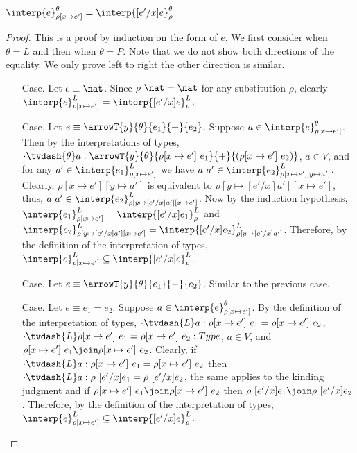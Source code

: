 \begin{lemma}
  \label{lemma:movable_subs}
  $\interp{e}^\theta_{\rho[x \mapsto e']} = \interp{[e'/x]e}^\theta_\rho$
\end{lemma}
\begin{proof}
  This is a proof by induction on the form of $e$.  We first consider when $\theta = L$ and
  then when $\theta = P$.  Note that we do not show both directions of the equality.  We only
  prove left to right the other direction is similar.
  
  \begin{itemize}
  \item[Case.] Let $e \equiv \nat$.  
    Since $\rho\ \nat = \nat$ for any substitution $\rho$, clearly
    $\interp{e}^L_{\rho[x \mapsto e']} = \interp{[e'/x]e}^L_\rho$.

  \item[Case.] Let $e \equiv \arrowT{y}{\theta}{e_1}{+}{e_2}$.  Suppose 
    $a \in \interp{e}^\theta_{\rho[x \mapsto e']}$.  Then by the interpretations of types,
    $\cdot \tvdash{\theta} a:
    \arrowT{y}{\theta}{\rho[x \mapsto e']\ e_1}{+}{(\rho[x \mapsto e']\ e_2)}$, 
    $a \in V$,
    and for any $a' \in \interp{e_1}^L_{\rho[x \mapsto e']}$ we have 
    $a\ a' \in \interp{e_2}^L_{\rho[x \mapsto e'][y \mapsto a']}$.  Clearly, 
    $\rho[x \mapsto e'][y \mapsto a']$ is equivalent to
    $\rho[y \mapsto [e'/x]a'][x \mapsto e']$, thus, 
    $a\ a' \in \interp{e_2}^L_{\rho[y \mapsto [e'/x]a'][x \mapsto e']}$.  Now by the induction
    hypothesis, $\interp{e_1}^L_{\rho[x \mapsto e']} = \interp{[e'/x]e_1}^L_{\rho}$ and
    $\interp{e_2}^L_{\rho[y \mapsto [e'/x]a'][x \mapsto e']} = 
    \interp{[e'/x]e_2}^L_{\rho[y \mapsto [e'/x]a']}$.  Therefore, by the definition of the 
    interpretation of types, $\interp{e}^L_{\rho[x \mapsto e']} \subseteq \interp{[e'/x]e}^L_\rho$.

  \item[Case.]  Let $e \equiv \arrowT{y}{\theta}{e_1}{-}{e_2}$.  Similar to the previous case.

  \item[Case.] Let $e \equiv e_1 = e_2$.  Suppose $a \in \interp{e}^\theta_{\rho[x \mapsto e']}$.
    By the definition of the interpretation of types, 
    $\cdot \tvdash{L} a:\rho[x \mapsto e']\ e_1 = \rho[x \mapsto e']\ e_2$, 
    $\cdot \tvdash{L} \rho[x \mapsto e']\ e_1 = \rho[x \mapsto e']\ e_2:Type$,
    $a \in V$, 
    and $\rho[x \mapsto e']\ e_1 \join \rho[x \mapsto e']\ e_2$.  Clearly, if 
    $\cdot \tvdash{L} a:\rho[x \mapsto e']\ e_1 = \rho[x \mapsto e']\ e_2$ then
    $\cdot \tvdash{L} a:\rho\ [e'/x]e_1 = \rho\ [e'/x]e_2$, the same applies to the kinding
    judgment and
    if $\rho[x \mapsto e']\ e_1 \join \rho[x \mapsto e']\ e_2$ then
    $\rho\ [e'/x]e_1 \join \rho\ [e'/x]e_2$.  Therefore, by the definition of the 
    interpretation of types, 
    $\interp{e}^L_{\rho[x \mapsto e']} \subseteq \interp{[e'/x]e}^L_\rho$.
  \end{itemize}
  

\end{proof}
